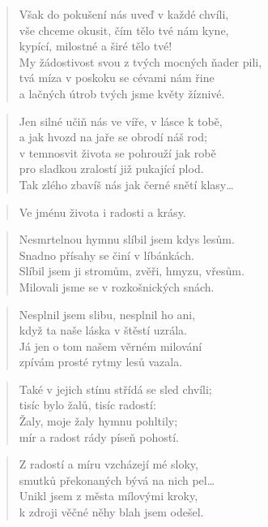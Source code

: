 \documentclass{book}
\begin{document}
\begin{verse}
Však do pokušení nás uveď v každé chvíli,\\
vše chceme okusit, čím tělo tvé nám kyne,\\
kypící, milostné a širé tělo tvé!\\
My žádostivost svou z tvých mocných ňader pili,\\
tvá míza v poskoku se cévami nám řine\\
a lačných útrob tvých jsme květy žíznivé.
\end{verse}
\begin{verse}
Jen silné učiň nás ve víře, v lásce k tobě,\\
a jak hvozd na jaře se obrodí náš rod;\\
v temnosvit života se pohrouží jak robě\\
pro sladkou zralostí již pukající plod.\\
Tak zlého zbavíš nás jak černé snětí klasy\ldots
\end{verse}
\begin{verse}
Ve jménu života i radosti a krásy.
\end{verse}
\newpage
{}
\begin{verse}
Nesmrtelnou hymnu slíbil jsem kdys lesům.\\
Snadno přísahy se činí v líbánkách.\\
Slíbil jsem ji stromům, zvěři, hmyzu, vřesům.\\
Milovali jsme se v rozkošnických snách.
\end{verse}
\begin{verse}
Nesplnil jsem slibu, nesplnil ho ani,\\
když ta naše láska v štěstí uzrála.\\
Já jen o tom našem věrném milování\\
zpívám prosté rytmy lesů vazala.
\end{verse}
\begin{verse}
Také v jejich stínu střídá se sled chvíli;\\
tisíc bylo žalů, tisíc radostí:\\
Žaly, moje žaly hymnu pohltily;\\
mír a radost rády píseň pohostí.
\end{verse}
\begin{verse}
Z radostí a míru vzcházejí mé sloky,\\
smutků překonaných bývá na nich pel\ldots\\
Unikl jsem z města mílovými kroky,\\
k zdroji věčné něhy blah jsem odešel.
\end{verse}
\end{document}
